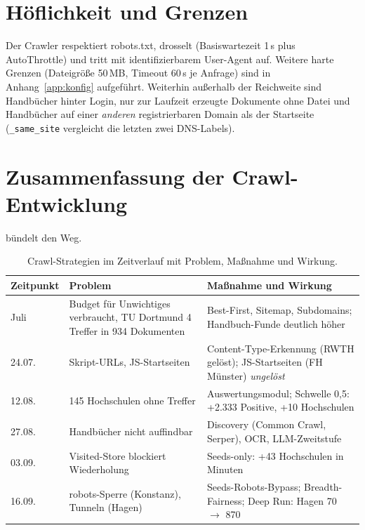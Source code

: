 \section{Höflichkeit und Grenzen}
Der Crawler respektiert robots.txt, drosselt (Basiswartezeit 1\,s plus AutoThrottle) und tritt mit identifizierbarem User-Agent auf. Weitere harte Grenzen (Dateigröße 50\,MB, Timeout 60\,s je Anfrage) sind in Anhang~\ref{app:konfig} aufgeführt. Weiterhin außerhalb der Reichweite sind Handbücher hinter Login, nur zur Laufzeit erzeugte Dokumente ohne Datei und Handbücher auf einer \emph{anderen} registrierbaren Domain als der Startseite (\texttt{\_same\_site} vergleicht die letzten zwei DNS-Labels).

\section{Zusammenfassung der Crawl-Entwicklung}
 bündelt den Weg.

\begin{table}[htbp]
\centering\small
\caption{Crawl-Strategien im Zeitverlauf mit Problem, Maßnahme und Wirkung.}\label{tab:crawl-weg}
\begin{tabularx}{\linewidth}{@{}p{2.2cm} p{3.6cm} X@{}}
\toprule
\textbf{Zeitpunkt} & \textbf{Problem} & \textbf{Maßnahme und Wirkung} \\
\midrule
Juli & Budget für Unwichtiges verbraucht, TU Dortmund 4 Treffer in 934 Dokumenten & Best-First, Sitemap, Subdomains; Handbuch-Funde deutlich höher \\
24.07. & Skript-URLs, JS-Startseiten & Content-Type-Erkennung (RWTH gelöst); JS-Startseiten (FH Münster) \emph{ungelöst} \\
12.08. & 145 Hochschulen ohne Treffer & Auswertungsmodul; Schwelle 0,5: +2.333 Positive, +10 Hochschulen \\
27.08. & Handbücher nicht auffindbar & Discovery (Common Crawl, Serper), OCR, LLM-Zweitstufe \\
03.09. & Visited-Store blockiert Wiederholung & Seeds-only: +43 Hochschulen in Minuten \\
16.09. & robots-Sperre (Konstanz), Tunneln (Hagen) & Seeds-Robots-Bypass; Breadth-Fairness; Deep Run: Hagen 70 $\to$ 870 \\
\bottomrule
\end{tabularx}
\end{table}
